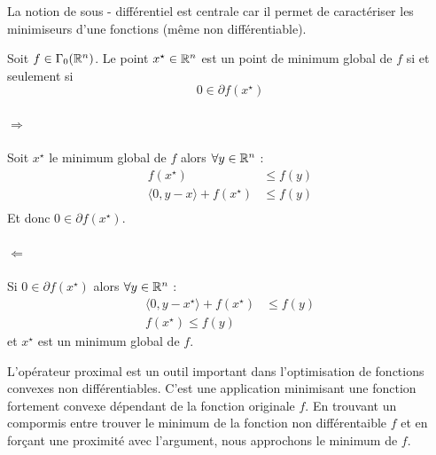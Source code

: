 \documentclass[a4paper,12pt]{article}
\begin{document}
La notion de sous - différentiel est centrale car il permet de caractériser les minimiseurs d'une fonctions (même non différentiable).
\begin{theoreme}{}
Soit $f\in\Gamma_0(\mathbb{R}^n)$. Le point $x^{\star}\in\mathbb{R}^n$ est un point de minimum global de $f$ si et seulement si 
$$
0\in \partial f(x^{\star})
$$ 
\end{theoreme}
\begin{preuve}
\vspace{-1cm}
\paragraph{$\Rightarrow$} Soit $x^{\star}$ le minimum global de $f$ alors $\forall y\in \mathbb{R}^n$ :
\begin{align*}
f(x^{\star}) &\leq f(y)\\
\langle 0,y-x\rangle +f(x^{\star}) &\leq f(y)\\
\end{align*}
Et donc $0\in \partial f(x^{\star})$. 
\paragraph{$\Leftarrow$} Si $0\in \partial f(x^{\star})$ alors $\forall y\in \mathbb{R}^n$ :
\begin{align*}
\langle 0,y-x^{\star}\rangle + f(x^{\star}) &\leq f(y)\\
f(x^{\star}) \leq f(y) 
\end{align*}
et $x^{\star}$ est un minimum global de $f$. 
\end{preuve}

L'opérateur proximal est un outil important dans l'optimisation de fonctions convexes non différentiables. C'est une application minimisant une fonction fortement convexe dépendant de la fonction originale $f$. En trouvant un compormis entre trouver le minimum de la fonction non différentaible $f$ et en forçant une proximité avec l'argument, nous approchons le minimum de $f$. 
\end{document}
